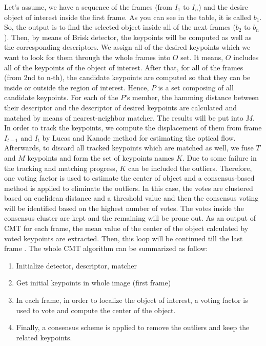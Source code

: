 \documentclass[[12pt,DIV14,BCOR12mm,a4paper,footexclude,headinclude,halfparskip-,twoside,openright,cleardoubleempty,idxtotoc,bibtotoc]{article}
\begin{document}
Let's assume, we have a sequence of the frames (from $I_1$ to $I_n$) and the desire object of interest inside the first frame. As you can see in the table, it is called $b_1$. 
So, the output is to find the selected object inside all of the next frames ($b_2$ to $b_n$). Then, by means of Brisk detector, the keypoints will be computed as well as the corresponding descriptors. We assign all of the desired keypoints which we want to look for them through the whole frames into $O$ set. It means, $O$ includes all of the keypoints of the object of interest. After that, for all of the frames (from 2nd to n-th), the candidate keypoints are computed so that they can be inside or outside the region of interest. Hence, $P$ is a set composing of all candidate keypoints. For each of the $P$'s member, the hamming distance between their descriptor and the descriptor of desired keypoints are calculated and matched by means of nearest-neighbor matcher. The results will be put into $M$. In order to track the keypoints, we compute the displacement of them from frame $I_{t-1}$ and $I_{t}$ by Lucas and Kanade method for estimating the optical flow. Afterwards, to discard all tracked keypoints which are matched as well, we fuse $T$ and $M$ keypoints and form the set of keypoints names $K$. Due to some failure in the tracking and matching progress, $K$ can be included the outliers. Therefore, one voting factor is used to estimate the center of object and a consensus-based method is applied to eliminate the outliers. In this case, the votes are clustered based on euclidean distance and a threshold value and then the consensus voting will be identified based on the highest number of votes. The votes inside the consensus cluster are kept and the remaining will be prone out. As an output of CMT for each frame, the mean value of the center of the object calculated by voted keypoints are extracted. Then, this loop will be continued till the last frame \cite{nebehay2014consensus}. The whole CMT algorithm can be summarized as follow:


\begin{enumerate}

\item Initialize detector, descriptor, matcher
\item Get initial keypoints in whole image (first frame)
\item In each frame, in order to localize the object of interest, a voting factor is used to vote and compute the center of the object.
\item Finally, a consensus scheme is applied to remove the outliers and keep the related keypoints.
\end{enumerate}
\end{document}
